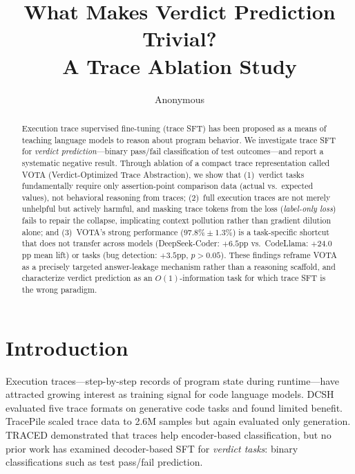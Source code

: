\documentclass[11pt,a4paper]{article}
\title{What Makes Verdict Prediction Trivial?\\A Trace Ablation Study}
\author{Anonymous}
\begin{document}
\maketitle

\begin{abstract}
Execution trace supervised fine-tuning (trace SFT) has been proposed as a means of teaching language models to reason about program behavior. We investigate trace SFT for \emph{verdict prediction}---binary pass/fail classification of test outcomes---and report a systematic negative result. Through ablation of a compact trace representation called VOTA (Verdict-Optimized Trace Abstraction), we show that (1)~verdict tasks fundamentally require only assertion-point comparison data (actual vs.\ expected values), not behavioral reasoning from traces; (2)~full execution traces are not merely unhelpful but actively harmful, and masking trace tokens from the loss (\emph{label-only loss}) fails to repair the collapse, implicating context pollution rather than gradient dilution alone; and (3)~VOTA's strong performance ($97.8\% \pm 1.3\%$) is a task-specific shortcut that does not transfer across models (DeepSeek-Coder: $+6.5$pp vs.\ CodeLlama: $+24.0$pp mean lift) or tasks (bug detection: $+3.5$pp, $p > 0.05$). These findings reframe VOTA as a precisely targeted answer-leakage mechanism rather than a reasoning scaffold, and characterize verdict prediction as an $O(1)$-information task for which trace SFT is the wrong paradigm.
\end{abstract}

\section{Introduction}
\label{sec:intro}

Execution traces---step-by-step records of program state during runtime---have attracted growing interest as training signal for code language models. DCSH \cite{dcsh2025} evaluated five trace formats on generative code tasks and found limited benefit. TracePile \cite{tracepile2025} scaled trace data to 2.6M samples but again evaluated only generation. TRACED \cite{traced2024} demonstrated that traces help encoder-based classification, but no prior work has examined decoder-based SFT for \emph{verdict tasks}: binary classifications such as test pass/fail prediction.
\end{document}
